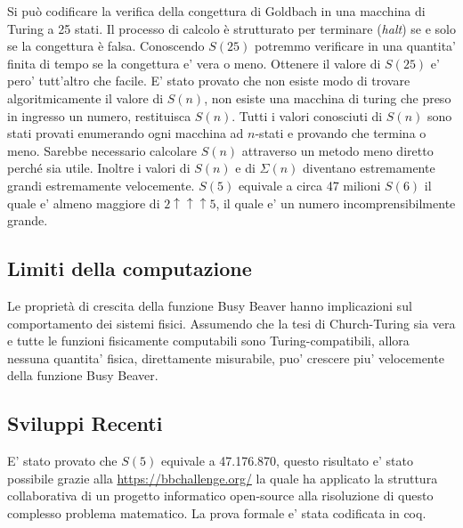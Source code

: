 \documentclass[12pt, a4paper, oneside]{article}
\begin{document}
Si può codificare la verifica della congettura di Goldbach in una macchina di Turing a 25 stati. Il processo di calcolo è strutturato per terminare (\textit{halt}) se e solo se la congettura è falsa.
Conoscendo $S(25)$ potremmo verificare in una quantita’ finita di tempo se la congettura e’ vera o meno.
\newline
Ottenere il valore di $S(25)$ e' pero' tutt'altro che facile.
\newline
E’ stato provato che non esiste modo di trovare algoritmicamente il valore di $S(n)$, non esiste una macchina di turing che preso in ingresso un numero, restituisca $S(n)$.
Tutti i valori conosciuti di $S(n)$ sono stati provati enumerando ogni macchina ad $n$-stati e provando che termina o meno.
\newline
Sarebbe necessario calcolare $S(n)$ attraverso un metodo meno diretto perché sia utile.
Inoltre i valori di $S(n)$ e di $\Sigma(n)$ diventano estremamente grandi estremamente velocemente.
$S(5)$ equivale a circa 47 milioni
\newline
$S(6)$ il quale e’ almeno maggiore di $2 \uparrow\uparrow\uparrow 5$, il quale e’ un numero incomprensibilmente grande.
\medskip
\medskip
\subsection*{Limiti della computazione}
Le proprietà di crescita della funzione Busy Beaver hanno implicazioni sul comportamento dei sistemi fisici.
Assumendo che la tesi di Church-Turing sia vera e tutte le funzioni fisicamente computabili sono Turing-compatibili, allora nessuna quantita’ fisica, direttamente misurabile, puo’ crescere piu’ velocemente della funzione Busy Beaver.

\subsection*{Sviluppi Recenti}
E’ stato provato che $S(5)$ equivale a 47.176.870, questo risultato e’ stato possibile grazie alla \url{https://bbchallenge.org/} la quale ha applicato la struttura collaborativa di un progetto informatico open-source alla risoluzione di questo complesso problema matematico.
La prova formale e’ stata codificata in coq.
\end{document}
